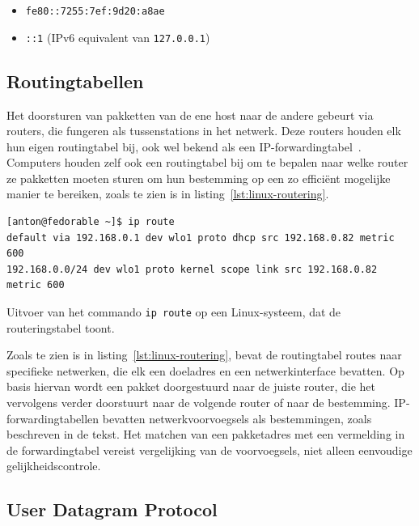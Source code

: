\begin{itemize}
    \item \texttt{fe80::7255:7ef:9d20:a8ae}
    \item \texttt{::1} (IPv6 equivalent van \texttt{127.0.0.1})
\end{itemize}

\subsection{Routingtabellen}
\label{netwerk_routeringstabel}

Het doorsturen van pakketten van de ene host naar de andere gebeurt via routers, die fungeren als tussenstations in het netwerk.
Deze routers houden elk hun eigen routingtabel bij, ook wel bekend als een IP-forwardingtabel~\autocite{dordal2020}.
Computers houden zelf ook een routingtabel bij om te bepalen naar welke router ze pakketten moeten sturen om hun bestemming op een zo efficiënt mogelijke manier te bereiken, zoals te zien is in listing~\ref{lst:linux-routering}.

\begin{listing}
  \begin{verbatim}
[anton@fedorable ~]$ ip route
default via 192.168.0.1 dev wlo1 proto dhcp src 192.168.0.82 metric 600
192.168.0.0/24 dev wlo1 proto kernel scope link src 192.168.0.82 metric 600
  \end{verbatim}
  \caption{Uitvoer van het commando \texttt{ip route} op een Linux-systeem, dat de routeringstabel toont.}
  \label{lst:linux-routering}
\end{listing}

Zoals te zien is in listing~\ref{lst:linux-routering}, bevat de routingtabel routes naar specifieke netwerken, die elk een doeladres en een netwerkinterface bevatten.
Op basis hiervan wordt een pakket doorgestuurd naar de juiste router, die het vervolgens verder doorstuurt naar de volgende router of naar de bestemming.
IP-forwardingtabellen bevatten netwerkvoorvoegsels als bestemmingen, zoals beschreven in de tekst.
Het matchen van een pakketadres met een vermelding in de forwardingtabel vereist vergelijking van de voorvoegsels, niet alleen eenvoudige gelijkheidscontrole.

\subsection{User Datagram Protocol}
\label{netwerk_udp}

